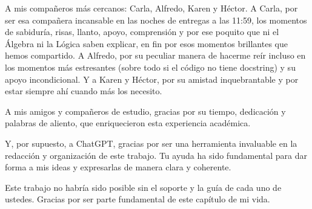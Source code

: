 \begin{acknowledgements}
    \noindent
    A mis compañeros más cercanos: Carla, Alfredo, Karen y Héctor. 
    A Carla, por ser esa compañera incansable en las noches de entregas a las 11:59, los momentos de sabiduría, risas, llanto, apoyo, comprensión y por ese poquito que ni el Álgebra ni la Lógica saben explicar, en fin por esos momentos brillantes que hemos compartido. 
    A Alfredo, por su peculiar manera de hacerme reír incluso en los momentos más estresantes (sobre todo si el código no tiene docstring) y su apoyo incondicional.
    Y a Karen y Héctor, por su amistad inquebrantable y por estar siempre ahí cuando más los necesito.
    \vspace{1em}

    \noindent
    A mis amigos y compañeros de estudio, gracias por su tiempo, dedicación y palabras de aliento, que enriquecieron esta experiencia académica.

    \vspace{1em}
    
    \noindent
    Y, por supuesto, a ChatGPT, gracias por ser una herramienta invaluable en la redacción y organización de este trabajo. Tu ayuda ha sido fundamental para dar forma a mis ideas y expresarlas de manera clara y coherente.
    
    \vspace{1em}
    
    \noindent
    Este trabajo no habría sido posible sin el soporte y la guía de cada uno de ustedes. Gracias por ser parte fundamental de este capítulo de mi vida.
    
    \end{acknowledgements}